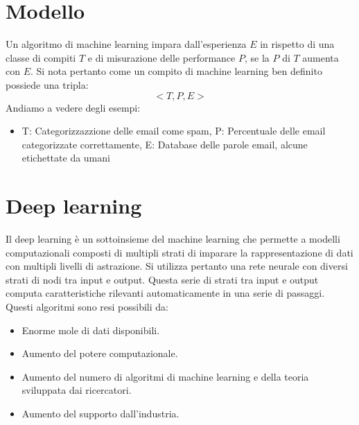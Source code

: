\section{Modello}
Un algoritmo di machine learning impara dall'esperienza $E$ in rispetto di una classe di compiti $T$ e di misurazione delle performance $P$, se la $P$ di $T$ aumenta con $E$.
Si nota pertanto come un compito di machine learning ben definito possiede una tripla:
$$<T, P, E>$$
Andiamo a vedere degli esempi:
\begin{itemize}
	\item T: Categorizzazzione delle email come spam, P: Percentuale delle email categorizzate correttamente, E: Database delle parole email, alcune etichettate da umani
\end{itemize}
\section{Deep learning}
Il deep learning \`e un sottoinsieme del machine learning che permette a modelli computazionali composti di multipli strati di imparare la rappresentazione di dati con multipli livelli di astrazione.
Si utilizza pertanto una rete neurale con diversi strati di nodi tra input e output.
Questa serie di strati tra input e output computa caratteristiche rilevanti automaticamente in una serie di passaggi.
Questi algoritmi sono resi possibili da:
\begin{multicols}{2}
	\begin{itemize}
		\item Enorme mole di dati disponibili.
		\item Aumento del potere computazionale.
		\item Aumento del numero di algoritmi di machine learning e della teoria sviluppata dai ricercatori.
		\item Aumento del supporto dall'industria.
	\end{itemize}
\end{multicols}
